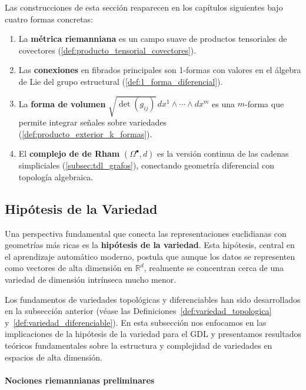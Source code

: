 \begin{remark}\label{rem:formas_gdl}
Las construcciones de esta sección reaparecen en los capítulos siguientes bajo cuatro formas concretas:
\begin{enumerate}
    \item La \textbf{métrica riemanniana} es un campo suave de productos tensoriales de covectores (\autoref{def:producto_tensorial_covectores}).
    \item Las \textbf{conexiones} en fibrados principales son 1-formas con valores en el álgebra de Lie del grupo estructural (\autoref{def:1_forma_diferencial}).
    \item La \textbf{forma de volumen} $\sqrt{\det(g_{ij})} \, dx^1 \wedge \cdots \wedge dx^m$ es una $m$-forma que permite integrar señales sobre variedades (\autoref{def:producto_exterior_k_formas}).
    \item El \textbf{complejo de de Rham} $(\Omega^\bullet, d)$ es la versión continua de las cadenas simpliciales (\autoref{subsec:tdl_grafos}), conectando geometría diferencial con topología algebraica.
\end{enumerate}
\end{remark}

\subsection{Hipótesis de la Variedad}\label{subsec:hipotesis_variedad}

Una perspectiva fundamental que conecta las representaciones euclidianas con geometrías más ricas es la \textbf{hipótesis de la variedad}. Esta hipótesis, central en el aprendizaje automático moderno, postula que aunque los datos se representen como vectores de alta dimensión en $\mathbb{R}^d$, realmente se concentran cerca de una variedad de dimensión intrínseca mucho menor.

Los fundamentos de variedades topológicas y diferenciables han sido desarrollados en la subsección anterior (véase las Definiciones~\ref{def:variedad_topologica} y~\ref{def:variedad_diferenciable}). En esta subsección nos enfocamos en las implicaciones de la hipótesis de la variedad para el \gls{GDL} y presentamos resultados teóricos fundamentales sobre la estructura y complejidad de variedades en espacios de alta dimensión.

\paragraph{Nociones riemannianas preliminares}

